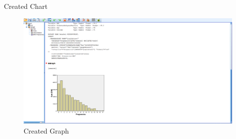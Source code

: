 \begin{frame}[t]{Created Chart}
	\begin{figure}
		\centering
		\includegraphics[width=12cm]{img/graph-1}
		\caption{Created Graph}
	\end{figure}
\end{frame}

